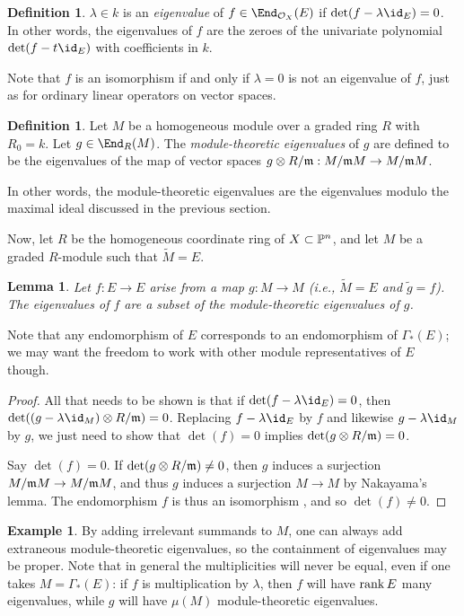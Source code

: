 \documentclass[12pt]{article}
\let\l\lambda
\let\wtilde\widetilde
\def\OO{\mathcal O}
\theoremstyle{theorem}
\numberwithin{thm}{section}
\newtheorem{lem}[thm]{Lemma}
\theoremstyle{definition}
\newtheorem{dfn}[thm]{Definition}
\newtheorem{exa}[thm]{Example}
\def\defn#1{{\it #1}}
\begin{document}
\begin{dfn}
  $\l \in k$ is an \defn{eigenvalue} of $f \in \End_{\OO_X}(E)$ if $\det(f-\l \id_E)= 0$. In other words, the eigenvalues of $f$ are the zeroes of the univariate polynomial $\det(f-t\id _E)$ with coefficients in $k$.
\end{dfn}

Note that $f$ is an isomorphism if and only if $\l=0$ is not an eigenvalue of $f$, just as for ordinary linear operators on vector spaces.

\begin{dfn}
  Let $M$ be a homogeneous module over a graded ring $R$ with $R_0=k$.
  Let $g \in \End_R(M)$. The \defn{module-theoretic eigenvalues} of $g$ are defined to be the eigenvalues of the map of vector spaces $g\otimes R/\m:M/\m M \to M/\m M$.
\end{dfn}

In other words, the module-theoretic eigenvalues are the eigenvalues modulo the maximal ideal discussed in the previous section.


Now, let $R$ be the homogeneous coordinate ring of $X\subset \P^n$, and let $M$ be a graded $R$-module such that $\wtilde M=E$.

\begin{lem}
  Let $f:E\to E$ arise from a map $g:M\to M$ (i.e., $\wtilde M = E$ and $\wtilde g = f$).
  The eigenvalues of $f$ are a subset of the module-theoretic eigenvalues of $g$.
\end{lem}

Note that any endomorphism of $E$ corresponds to an endomorphism of $\Gamma_*(E)$; we may want the freedom to work with other module representatives of $E$ though.

\begin{proof}
  All that needs to be shown is that if $\det(f-\l \id_E) =0$, then $\det((g-\l \id_M)\otimes R/\m)=0$.
  Replacing
  $f-\l \id_E$
  by
  $f$
  and likewise
  $g-\l\id_M$
  by
  $g$,
  we just need to show that $\det(f)=0$ implies $\det(g\otimes R/\m)=0$.

  Say $\det(f)=0$.
  If $\det(g\otimes R/\m)\neq 0$, then $g$ induces a surjection $M/\m M\to M/\m M$, and thus $g$ induces a surjection $M\to M$ by Nakayama's lemma. The endomorphism $f$ is thus an isomorphism \cite[Corollary~4.4]{Eisenbud95}, and so $\det(f)\neq 0$.
\end{proof}

\begin{exa}
  By adding  irrelevant summands to $M$, one can always add extraneous module-theoretic eigenvalues, so the containment of eigenvalues may be proper.
  Note that in general the multiplicities will never be equal, even if one takes $M=\Gamma_*(E)$: if $f$ is multiplication by $\l$, then $f$ will have $\rank E$ many eigenvalues, while $g$ will have $\mu(M)$ module-theoretic eigenvalues.
\end{exa}
\end{document}
